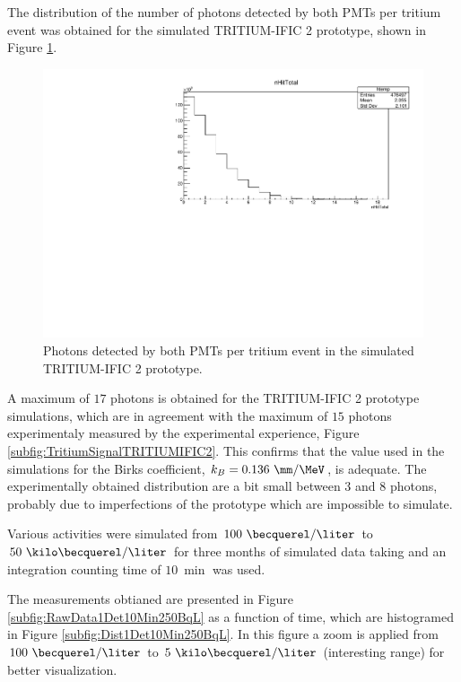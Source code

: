 The distribution of the number of photons detected by both PMTs per tritium event was obtained for the simulated TRITIUM-IFIC 2 prototype, shown in Figure \ref{fig:SimulatedPhotonsDetected}.

\begin{figure}[hbtp]
\centering
\includegraphics[scale=0.65]{Figures/8SimulationsResults/82TRITIUMMonitor/821TRITIUMIFIC2/PhotonsDetected_simulation.pdf}
\caption{Photons detected by both PMTs per tritium event in the simulated TRITIUM-IFIC 2 prototype.\label{fig:SimulatedPhotonsDetected}}
\end{figure}

A maximum of $17$ photons is obtained for the TRITIUM-IFIC 2 prototype simulations, which are in agreement with the maximum of $15$ photons experimentaly measured by the experimental experience, Figure \ref{subfig:TritiumSignalTRITIUMIFIC2}. This confirms that the value used in the simulations for the Birks coefficient, $k_B=0.136~\mm/\MeV$, is adequate. The experimentally obtained distribution are a bit small between $3$ and $8$ photons, probably due to imperfections of the prototype which are impossible to simulate.

Various activities were simulated from $100~\becquerel/\liter$ to $50~\kilo\becquerel/\liter$ for three months of simulated data taking and an integration counting time of $10~\min$ was used.

The measurements obtianed are presented in Figure \ref{subfig:RawData1Det10Min250BqL} as a function of time, which are histogramed in Figure \ref{subfig:Dist1Det10Min250BqL}. In this figure a zoom is applied from $100~\becquerel/\liter$ to $5~\kilo\becquerel/\liter$ (interesting range) for better visualization.

